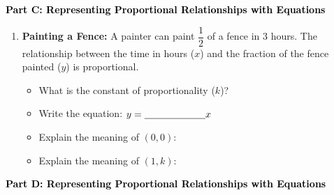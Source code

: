 \documentclass[12pt, letterpaper, fleqn]{article}
\newcommand{\blank}{\underline{\hspace{2.2cm}}}
\newcommand{\blanklong}{\underline{\hspace{6.5cm}}}
\newcommand{\blankshorter}{\underline{\hspace{1.5cm}}}
\begin{document}
\newpage

\begin{tcolorbox}[colback=customteal!20]
\large\textcolor{black}{\textbf{Part C: Representing Proportional Relationships with Equations}}
\end{tcolorbox}

\vspace{3mm}

\begin{enumerate}[itemsep=2.2cm, leftmargin=0.6cm, resume]
\item \textbf{Painting a Fence:} A painter can paint $\dfrac{1}{2}$ of a fence in $3$ hours. The relationship between the time in hours ($x$) and the fraction of the fence painted ($y$) is proportional.
\begin{itemize}
\item What is the constant of proportionality ($k$)? \blankshorter
\item Write the equation: $y = \blank x$
\item Explain the meaning of $(0,0)$: \blanklong
\item Explain the meaning of $(1, k)$: \blanklong
\end{itemize}
\end{enumerate}

\newpage

\begin{tcolorbox}[colback=customteal!20]
\large\textcolor{black}{\textbf{Part D: Representing Proportional Relationships with Equations}}
\end{tcolorbox}

\vspace{3mm}
\end{document}
